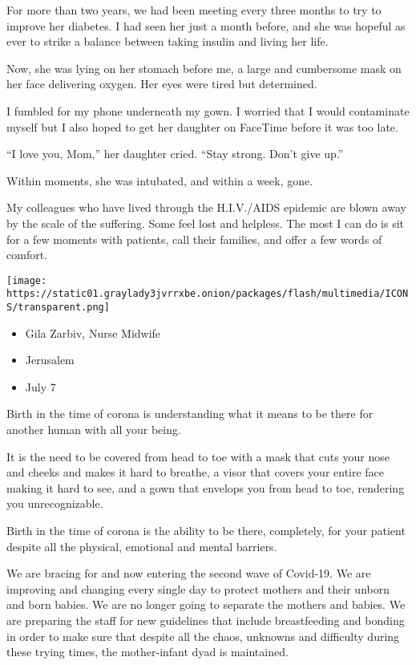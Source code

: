 For more than two years, we had been meeting every three months to try
to improve her diabetes. I had seen her just a month before, and she was
hopeful as ever to strike a balance between taking insulin and living
her life.

Now, she was lying on her stomach before me, a large and cumbersome mask
on her face delivering oxygen. Her eyes were tired but determined.

I fumbled for my phone underneath my gown. I worried that I would
contaminate myself but I also hoped to get her daughter on FaceTime
before it was too late.

``I love you, Mom,'' her daughter cried. ``Stay strong. Don't give up.''

Within moments, she was intubated, and within a week, gone.

My colleagues who have lived through the H.I.V./AIDS epidemic are blown
away by the scale of the suffering. Some feel lost and helpless. The
most I can do is sit for a few moments with patients, call their
families, and offer a few words of comfort.

\texttt{[image: https://static01.graylady3jvrrxbe.onion/packages/flash/multimedia/ICONS/transparent.png]}

\begin{itemize}
\tightlist
\item
  Gila Zarbiv, Nurse Midwife
\item
  Jerusalem
\item
  July 7
\end{itemize}

Birth in the time of corona is understanding what it means to be there
for another human with all your being.

It is the need to be covered from head to toe with a mask that cuts your
nose and cheeks and makes it hard to breathe, a visor that covers your
entire face making it hard to see, and a gown that envelops you from
head to toe, rendering you unrecognizable.

Birth in the time of corona is the ability to be there, completely, for
your patient despite all the physical, emotional and mental barriers.

We are bracing for and now entering the second wave of Covid-19. We are
improving and changing every single day to protect mothers and their
unborn and born babies. We are no longer going to separate the mothers
and babies. We are preparing the staff for new guidelines that include
breastfeeding and bonding in order to make sure that despite all the
chaos, unknowns and difficulty during these trying times, the
mother-infant dyad is maintained.


